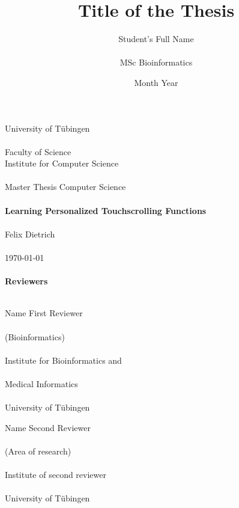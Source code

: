 \documentclass[12pt,a4paper]{report}
\title{\textbf{Title of the Thesis}}
\author{Student's Full Name\\\\MSc Bioinformatics}
\date{Month Year}
\begin{document}



        \begin{titlepage}
        \begin{center}
        {\LARGE University of Tübingen}\\\\
        {\large Faculty of Science \\
        Institute for Computer Science\\\\[4cm]}
        {\huge Master Thesis Computer Science\\\\[2cm]}
        {\Large\bf Learning Personalized Touchscrolling Functions\\\\[1.5cm]}
        {Felix Dietrich}\\\\[0.5cm]
        \today\\\\[3cm]
        {\small\bf Reviewers}\\\\[0.5cm]
        \parbox{7cm}{\begin{center}{\large Name First Reviewer}\\\\
        (Bioinformatics)\\\\
        {\footnotesize Institute for Bioinformatics and\\\\ Medical Informatics\\\\
            University of T\"ubingen}\end{center}}\hfill\parbox{7cm}{\begin{center}
        {\large Name Second Reviewer}\\\\
        (Area of research)\\\\
        {\footnotesize Institute of second reviewer\\\\
            University of T\"ubingen}\end{center}
        }
        \end{center}
        \end{titlepage}
\end{document}
